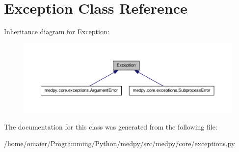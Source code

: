\hypertarget{classException}{
\section{Exception Class Reference}
\label{classException}
}


Inheritance diagram for Exception:\nopagebreak
\begin{figure}[H]
\begin{center}
\leavevmode
\includegraphics[width=400pt]{classException__inherit__graph}
\end{center}
\end{figure}


The documentation for this class was generated from the following file:\begin{DoxyCompactItemize}
\item 
/home/omaier/Programming/Python/medpy/src/medpy/core/exceptions.py\end{DoxyCompactItemize}
